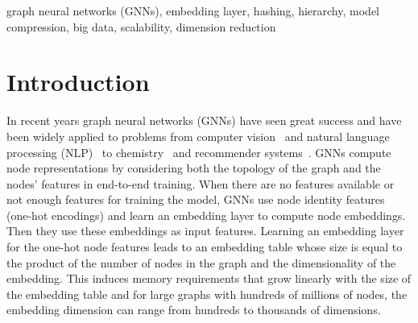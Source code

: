 \documentclass[conference]{IEEEtran}
\begin{document}
\begin{IEEEkeywords}
graph neural networks (GNNs), embedding layer, hashing, hierarchy, model compression, big data, scalability, dimension reduction
\end{IEEEkeywords}


\section{Introduction}
In recent years graph neural networks (GNNs) have seen great success and have been widely applied to problems from computer vision~\cite{te2018rgcnn} and natural language processing (NLP)~\cite{marcheggiani2018exploiting, manchanda2021importance} to chemistry~\cite{shui2020heterogeneous} and recommender systems~\cite{ying2018graph}.
% 
GNNs compute node representations by considering both the topology of the graph and the nodes' features in end-to-end training. When there are no features available or not enough features for training the model, GNNs use node identity features (one-hot encodings) and learn an embedding layer to compute node embeddings. Then they use these embeddings as input features.
% 
% 
% 
% 
Learning an embedding layer for the one-hot node features leads to an embedding table whose size is equal to the product of the number of nodes in the graph and the dimensionality of the embedding. This induces memory requirements that grow linearly with the size of the embedding table and for large graphs with hundreds of millions of nodes, the embedding dimension can range from hundreds to thousands of dimensions.
% 
% 
\end{document}
